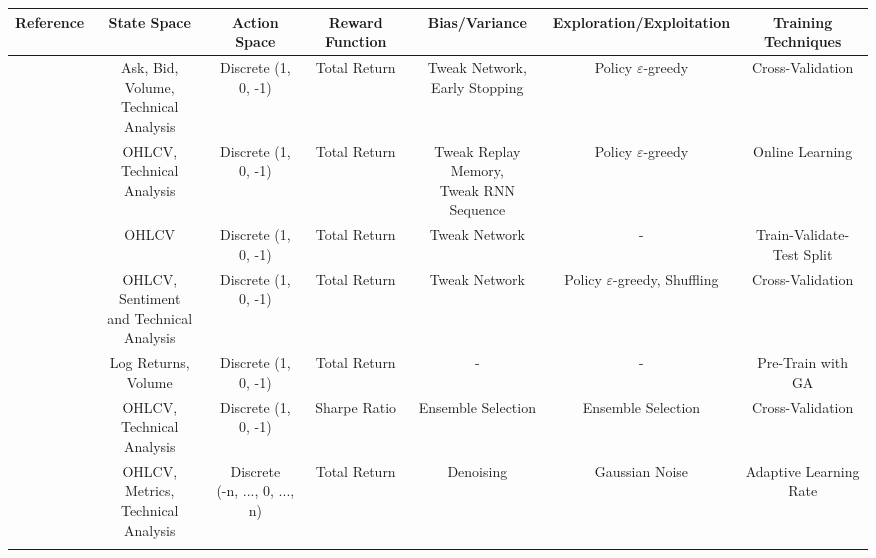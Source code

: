 \begin{table}
\centering
\footnotesize
\begin{tabularx}{\linewidth}{@{}ccccccc@{}}
\toprule
\textbf{Reference} & \textbf{State Space} & \textbf{Action Space} & \textbf{Reward Function} & \textbf{Bias/Variance} & \textbf{Exploration/Exploitation} & \textbf{Training Techniques} \\ 
\midrule

\cite{carapuco_reinforcement_2018} & \makecell{Ask, Bid, Volume, \\ Technical Analysis} & Discrete (1, 0, -1) & Total Return & \makecell{Tweak Network, \\ Early Stopping} & Policy \(\varepsilon\)-greedy & Cross-Validation \\
\addlinespace

\cite{huang_financial_2018} & \makecell{OHLCV, \\ Technical Analysis} & Discrete (1, 0, -1) & Total Return & \makecell{Tweak Replay Memory, \\ Tweak RNN Sequence} & Policy \(\varepsilon\)-greedy & Online Learning \\
\addlinespace

\cite{rundo_deep_2019} & OHLCV & Discrete (1, 0, -1) & Total Return & Tweak Network & - & Train-Validate-Test Split \\
\addlinespace

\cite{saini_stock_2019} & \makecell{OHLCV, Sentiment \\ and Technical Analysis} & Discrete (1, 0, -1) & Total Return & Tweak Network & Policy \(\varepsilon\)-greedy, Shuffling &  Cross-Validation \\
\addlinespace

\cite{gran_deep_2019} & Log Returns, Volume & Discrete (1, 0, -1) & Total Return & - & - & Pre-Train with GA \\
\addlinespace

\cite{kong_empirical_2023} & \makecell{OHLCV, \\ Technical Analysis} & Discrete (1, 0, -1) & Sharpe Ratio & Ensemble Selection & Ensemble Selection & Cross-Validation \\
\addlinespace

\cite{li_deep_2019} & \makecell{OHLCV, Metrics, \\ Technical Analysis } & \makecell{Discrete \\ (-n, ..., 0, ..., n)} & Total Return & Denoising & Gaussian Noise & Adaptive Learning Rate \\
\addlinespace


\end{tabularx}
\end{table}
